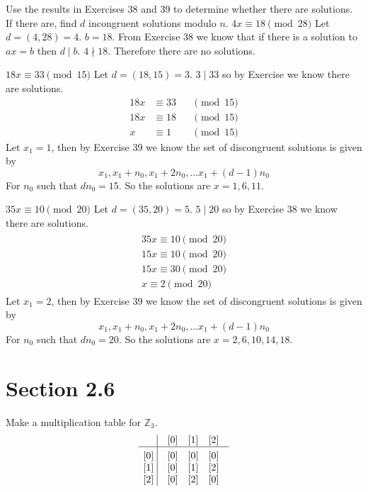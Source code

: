 \documentclass[paper=a4, fontsize=11pt]{jhwhw} %
\begin{document}
Use the results in Exercises 38 and 39 to determine whether there are solutions. If there are, find $d$ incongruent solutions modulo $n$.
$4x\equiv 18 \pmod{28}$
\solution
Let $d=(4,28)=4$. $b=18$. From Exercise 38 we know that if there is a solution to $ax=b$ then $d\mid b$. $4 \nmid 18$. Therefore there are no solutions.

$18x\equiv 33 \pmod{15}$
\solution
Let $d=(18, 15) = 3$. $3\mid 33$ so by Exercise we know there are solutions. 
\begin{equation}
\begin{alignedat}{2}
18x&\equiv 33 & &\pmod{15}\\
18x&\equiv 18 & &\pmod{15}\\
x&\equiv 1 & &\pmod{15}
\end{alignedat}
\end{equation}
Let $x_1 = 1$, then by Exercise 39 we know the set of discongruent solutions is given by
$$x_1, x_1+n_0, x_1+2n_0, \ldots x_1 + (d-1)n_0$$
For $n_0$ such that $dn_0=15$.
So the solutions are $x=1, 6, 11$.


$35x\equiv 10\pmod{20}$
\solution
Let $d=(35, 20) = 5$. $5\mid 20$ so by Exercise 38 we know there are solutions. 
\begin{align}
\begin{split}
35x\equiv 10 \pmod{20}\\
15x\equiv 10 \pmod{20}\\
15x\equiv 30 \pmod{20}\\
x\equiv 2 \pmod{20}
\end{split}
\end{align}
Let $x_1 = 2$, then by Exercise 39 we know the set of discongruent solutions is given by
$$x_1, x_1+n_0, x_1+2n_0, \ldots x_1 + (d-1)n_0$$
For $n_0$ such that $dn_0=20$.
So the solutions are $x=2, 6, 10, 14, 18$.

\newpage
\section*{Section 2.6}
Make a multiplication table for $\mathbb{Z}_3$.
\solution
$$\vbox{\tabskip0.5em\offinterlineskip
    \halign{\strut$#$\hfil\ \tabskip1em\vrule&&$#$\hfil\cr
    ~   & [0]   & [1]   & [2]       \cr
    \noalign{\hrule}\vrule height 12pt width 0pt
    [0]   & [0]   & [0]   & [0]       \cr
    [1]   & [0]   & [1] & [2]         \cr
    [2] & [0] & [2]   & [0]      \cr
}}$$
\end{document}
